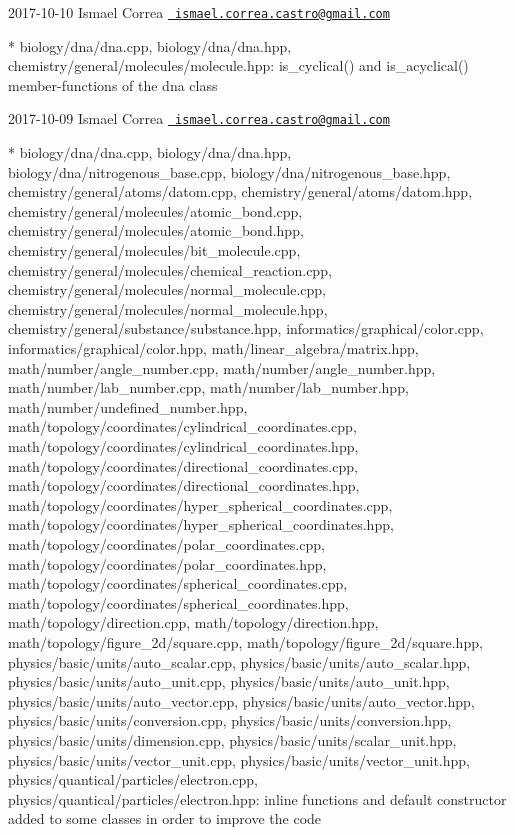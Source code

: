  2017-\/10-\/10 Ismael Correa \href{mailto:ismael.correa.castro@gmail.com}{\texttt{ ismael.\+correa.\+castro@gmail.\+com}} \begin{DoxyVerb}* biology/dna/dna.cpp, biology/dna/dna.hpp,
chemistry/general/molecules/molecule.hpp: is_cyclical() and
is_acyclical() member-functions of the dna class
\end{DoxyVerb}
 2017-\/10-\/09 Ismael Correa \href{mailto:ismael.correa.castro@gmail.com}{\texttt{ ismael.\+correa.\+castro@gmail.\+com}} \begin{DoxyVerb}* biology/dna/dna.cpp, biology/dna/dna.hpp,
biology/dna/nitrogenous_base.cpp, biology/dna/nitrogenous_base.hpp,
chemistry/general/atoms/datom.cpp,
chemistry/general/atoms/datom.hpp,
chemistry/general/molecules/atomic_bond.cpp,
chemistry/general/molecules/atomic_bond.hpp,
chemistry/general/molecules/bit_molecule.cpp,
chemistry/general/molecules/chemical_reaction.cpp,
chemistry/general/molecules/normal_molecule.cpp,
chemistry/general/molecules/normal_molecule.hpp,
chemistry/general/substance/substance.hpp,
informatics/graphical/color.cpp, informatics/graphical/color.hpp,
math/linear_algebra/matrix.hpp, math/number/angle_number.cpp,
math/number/angle_number.hpp, math/number/lab_number.cpp,
math/number/lab_number.hpp, math/number/undefined_number.hpp,
math/topology/coordinates/cylindrical_coordinates.cpp,
math/topology/coordinates/cylindrical_coordinates.hpp,
math/topology/coordinates/directional_coordinates.cpp,
math/topology/coordinates/directional_coordinates.hpp,
math/topology/coordinates/hyper_spherical_coordinates.cpp,
math/topology/coordinates/hyper_spherical_coordinates.hpp,
math/topology/coordinates/polar_coordinates.cpp,
math/topology/coordinates/polar_coordinates.hpp,
math/topology/coordinates/spherical_coordinates.cpp,
math/topology/coordinates/spherical_coordinates.hpp,
math/topology/direction.cpp, math/topology/direction.hpp,
math/topology/figure_2d/square.cpp,
math/topology/figure_2d/square.hpp,
physics/basic/units/auto_scalar.cpp,
physics/basic/units/auto_scalar.hpp,
physics/basic/units/auto_unit.cpp,
physics/basic/units/auto_unit.hpp,
physics/basic/units/auto_vector.cpp,
physics/basic/units/auto_vector.hpp,
physics/basic/units/conversion.cpp,
physics/basic/units/conversion.hpp,
physics/basic/units/dimension.cpp,
physics/basic/units/scalar_unit.hpp,
physics/basic/units/vector_unit.cpp,
physics/basic/units/vector_unit.hpp,
physics/quantical/particles/electron.cpp,
physics/quantical/particles/electron.hpp: inline functions and
default constructor added to some classes in order to improve the
code
\end{DoxyVerb}
